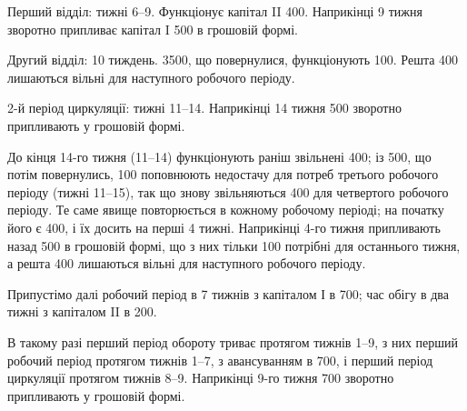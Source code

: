 Перший відділ: тижні 6--9. Функціонує капітал II \deq{} 400.
Наприкінці 9 тижня зворотно припливає капітал I \deq{} 500 в грошовій
формі.

Другий відділ: 10 тиждень. \num{3500}, що повернулися, функціонують
100. Решта 400 лишаються вільні для наступного
робочого періоду.

2-й період циркуляції: тижні 11--14. Наприкінці 14 тижня 500 зворотно припливають у грошовій формі.

\vtyagnut{}
До кінця 14-го тижня (11--14) функціонують раніш звільнені 400; із 500, що потім повернулись, 100 поповнюють
недостачу для потреб третього робочого періоду (тижні 11--15),
так що знову звільняються 400 для четвертого робочого періоду.
Те саме явище повторюється в кожному робочому періоді; на
початку його є 400, і їх досить на перші 4 тижні. Наприкінці
4-го тижня припливають назад 500 в грошовій формі, що з
них тільки 100 потрібні для останнього тижня, а решта 400 лишаються вільні для наступного робочого періоду.

Припустімо далі робочий період в 7 тижнів з капіталом І в 700; час обігу в два тижні з капіталом II в 200.

В такому разі перший період обороту триває протягом тижнів 1--9,
з них перший робочий період протягом тижнів 1--7, з авансуванням
в 700, і перший період циркуляції протягом тижнів 8--9. Наприкінці
9-го тижня 700 зворотно припливають у грошовій формі.
